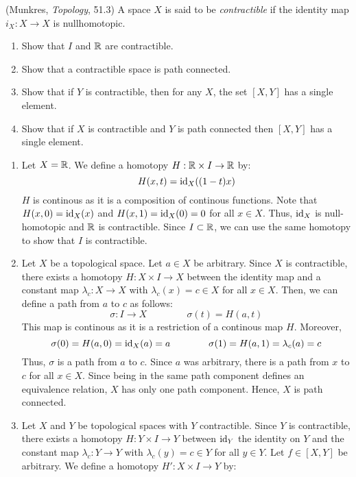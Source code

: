 \documentclass[12pt]{article}
\begin{document}
\begin{problem}{7}
(Munkres, \emph{Topology}, 51.3) A space $X$ is said to be \emph{contractible} if the identity map $i_X: X \to X$ is nullhomotopic. 
\begin{enumerate}
\item Show that $I$ and $\mathbb R$ are contractible.
\item Show that a contractible space is path connected.
\item Show that if $Y$ is contractible, then for any $X$, the set $[X,Y]$ has a single element.
\item Show that if $X$ is contractible and $Y$ is path connected then $[X,Y]$ has a single element. 
\end{enumerate}
\end{problem}
\begin{solution}
    \bbni
    \begin{enumerate}
        \item Let $X = \mathbb R$. We define a homotopy $H : \mathbb R \times I \to \mathbb R$ by: 
        \[  H(x, t) = \operatorname{id}_X((1-t)x) \]
        $H$ is continous as it is a composition of continous functions. Note that $H(x, 0) = \operatorname{id}_X(x)$ and $H(x, 1) = \operatorname{id}_X(0) = 0$ for all $x \in X$. Thus, $\operatorname{id}_X$ is null-homotopic and $\mathbb R$ is contractible. Since $I \subset \mathbb R$, we can use the same homotopy to show that $I$ is contractible. 
        \item Let $X$ be a topological space. Let $a \in X$ be arbitrary. Since $X$ is contractible, there exists a homotopy $H : X \times I \to X$ between the identity map and a constant map $\lambda_c: X \to X$ with $\lambda_c(x) = c \in X$ for all $x \in X$. Then, we can define a path from $a$ to $c$ as follows:  
        \[ \sigma: I \to X \qquad \qquad\,  \sigma(t) = H(a, t) \]
        This  map is continous as it is a restriction of a continous map $H$. Moreover, 
        \[ \sigma(0) = H(a, 0) = \operatorname{id}_X(a) = a \qquad \qquad \sigma(1) = H(a, 1) = \lambda_c(a) = c \]
        Thus, $\sigma$ is a path from $a$ to $c$. Since $a$ was arbitrary, there is a path from $x$ to $c$ for all $x \in X$. Since being in the same path component defines an equivalence relation, $X$ has only one path component. Hence, $X$ is path connected.
        \item Let $X$ and $Y$ be topological spaces with $Y$ contractible. Since $Y$ is contractible, there exists a homotopy $H: Y \times I \to Y$ between $\operatorname{id}_Y$ the identity on $Y$ and the constant map $\lambda_c: Y \to Y$ with $\lambda_c(y) = c \in Y$ for all $y \in Y$. Let $f \in [X,Y]$ be arbitrary. We define a homotopy $H': X \times I \to Y$ by:

\end{enumerate}
\end{solution}
\end{document}
